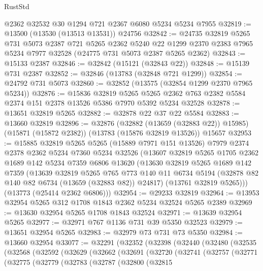 \begin{lexlean}{RustStd}
\begin{coremodule}
    @2362
    @32532
    @30
    @1294
    @721
    @2367
    @6080
    @5234
    @5234
    @7955
@32819 := @13500 (@13530 (@13513 @13531)) @24756
@32842 := @24735
    @32819
    @5265
    @731
    @5073
    @2387
    @721
    @5265
    @2362
    @5240
    @22
    @1299
    @2370
    @2383
    @7965
    @5234
    @7977
    @32528
    (@24775 @731 @5073 @2387 @5265 @2362)
@32843 := @15133 @2387
@32846 := @32842 (@15121 (@32843 @22))
@32848 := @15139 @731 @2387
@32852 := @32846 (@13783 (@32848 @721 @1299))
@32854 := @24792 @731 @5073
@32860 := @32852 (@13575 (@32854 @1299 @2370 @7965 @5234))
@32876 := @15836
    @32819
    @5265
    @5265
    @2362
    @763
    @2382
    @5584
    @2374
    @151
    @2378
    @13526
    @5386
    @7970
    @5392
    @5234
    @32528
@32878 := @13651 @32819 @5265
@32882 := @32878 @22 @37 @22 @5584
@32883 := @13660 @32819
@32896 := @32876
    (@32882 (@13659 (@32883 @22)) @15985)
    (@15871 (@15872 @2382))
    (@13783 (@15876 @32819 @13526))
    @15657
@32953 := @15885
    @32819
    @5265
    @5265
    (@15889 @7971 @151 @13526)
    @7979
    @2374
    @2378
    @2362
    @5234
    @7360
    @5234
    @32526
    (@13607
      @32819
      @5265
      @1705
      @2362
      @1689
      @142
      @5234
      @7359
      @6806
      @13620
      (@13630
        @32819
        @5265
        @1689
        @142
        @7359
        (@13639
          @32819
          @5265
          @765
          @773
          @140
          @11
          @6734
          @5194
          (@32878 @82 @140 @82 @6734 (@13659 (@32883 @82)) @24817)
          (@13761 @32819 @5265)))
      (@13773 (@25414 @2362 @6806)))
@32954 := @29233 @32819
@32964 := @13953 @32954 @5265 @312 @1708 @1843 @2362 @5234 @32524 @5265 @2389
@32969 := @13630 @32954 @5265 @1708 @1843 @32524
@32971 := @13639 @32954 @5265
@32977 := @32971 @767 @1136 @731 @39 @5350 @32523
@32979 := @13651 @32954 @5265
@32983 := @32979 @73 @731 @73 @5350
@32984 := @13660 @32954
@33077 := @32291
    (@32352
      (@32398
        (@32440
          (@32480
            (@32535
              (@32568
                (@32592
                  (@32629
                    (@32662
                      (@32691
                        (@32720
                          (@32741
                            (@32757
                              (@32771
                                (@32775
                                  (@32779
                                    (@32783
                                      (@32787
                                        (@32800
                                          (@32815

\end{coremodule}
\end{lexlean}
